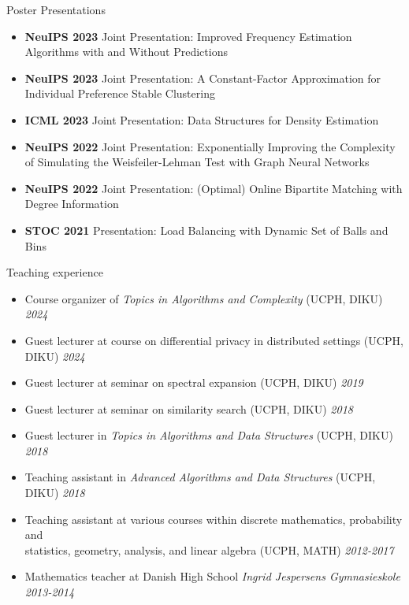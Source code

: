 \documentclass{resume} %
\begin{document}
  \begin{rSection}{Poster Presentations}
 \begin{itemize}
  \item  \textbf{NeuIPS 2023} Joint Presentation: Improved Frequency Estimation Algorithms with and Without Predictions
  \item  \textbf{NeuIPS 2023} Joint Presentation: A Constant-Factor Approximation for Individual Preference Stable Clustering
  \item  \textbf{ICML 2023} Joint Presentation: Data Structures for Density Estimation
  \item  \textbf{NeuIPS 2022} Joint Presentation: Exponentially Improving the Complexity of Simulating the Weisfeiler-Lehman Test with
Graph Neural Networks
  \item  \textbf{NeuIPS 2022} Joint Presentation: (Optimal) Online Bipartite Matching with Degree Information
  \item  \textbf{STOC 2021} Presentation: Load Balancing with Dynamic Set of Balls and Bins
 \end{itemize}
 \end{rSection}

\begin{rSection}{Teaching experience}
 \begin{itemize}
 \item Course organizer of \emph{Topics in Algorithms and Complexity} (UCPH, DIKU) \hfill{\emph{2024}}
 \item Guest lecturer at course on differential privacy in distributed settings (UCPH, DIKU) \hfill{\emph{2024}}
 \item Guest lecturer at seminar on spectral expansion (UCPH, DIKU) \hfill{\emph{2019}}
 \item Guest lecturer at seminar on similarity search (UCPH, DIKU) \hfill{\emph{2018}}
 \item Guest lecturer in \emph{Topics in Algorithms and Data Structures} (UCPH, DIKU) \hfill{\emph{2018}}
 \item Teaching assistant in \emph{Advanced Algorithms and Data Structures} (UCPH, DIKU) \hfill{\emph{2018}}
 \item Teaching assistant at various courses within discrete mathematics, probability and \\ statistics, geometry, analysis, and linear algebra (UCPH, MATH) \hfill{\emph{2012-2017}}
 \item Mathematics teacher at Danish High School \emph{Ingrid Jespersens Gymnasieskole} \hfill{\emph{2013-2014}}
 \end{itemize}
 \end{rSection}
\end{document}
